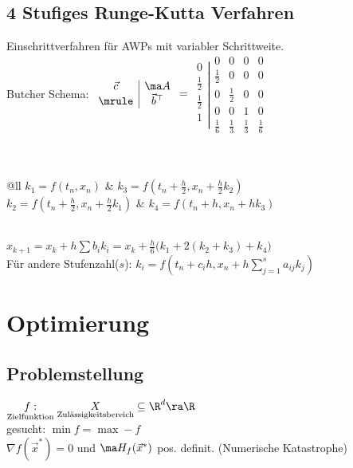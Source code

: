 \documentclass[fs, footer]{latex4ei}
\begin{document}
\begin{sectionbox}
\begin{sectionbox}
\begin{sectionbox}
	\subsection{4 Stufiges Runge-Kutta Verfahren}
	Einschrittverfahren für AWPs mit variabler Schrittweite.\\
	Butcher Schema: $\begin{array}{c|c} \vec c & \ma A \\ \mrule & \vec b^\top \end{array} =$
	$\left. \begin{matrix}0 \\ \frac 1 2 \\ \frac 1 2 \\ 1 \\ \text{}\end{matrix} \right| \begin{matrix}0 & 0 & 0 & 0 \\ \frac 1 2 & 0 & 0 & 0 \\ 0 & \frac 1 2 & 0 & 0 \\ 0 & 0 & 1 & 0 \\ \frac 1 6 & \frac 1 3 & \frac 1 3 & \frac 1 6\end{matrix}$ \\ \\ \\
	\begin{tablebox}{@{}ll}
		$k_1 =f( t_n, x_n)$ & $k_3 = f(t_n + \frac h 2, x_n + \frac h 2 k_2)$\\
		$k_2 = f(t_n + \frac h 2 , x_n + \frac h 2 k_1) $ & $k_4 = f(t_n + h , x_n + h k_3)$\\
	\end{tablebox}\\[0.5em]
	$x_{k+1} = x_k + h \sum b_i k_i = x_k + \frac{h}{6}\big(k_1 + 2(k_2 + k_3) + k_4\big)$ \\
	
	Für andere Stufenzahl($s$): $k_i = f(t_n + c_i h, x_n + h \sum \limits_{j=1}^s a_{ij} k_j)$
\end{sectionbox}

\section{Optimierung}
\begin{sectionbox}
	\subsection*{Problemstellung}
	$\underset{\text{Zielfunktion}}{f:} \underset{\text{Zulässigkeitsbereich}}{X} \subseteq \R^d \ra \R$\\
	gesucht: $\min f = \max -f$\\
	$\nabla f(\vec x^*) = 0$ und $\ma H_f(\vec x^*)$ pos. definit. (Numerische Katastrophe)
\end{sectionbox} \\ \\


\end{sectionbox}
\end{sectionbox}
\end{document}
